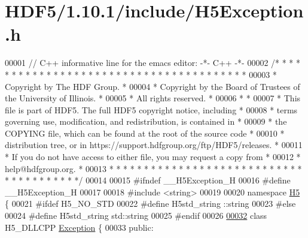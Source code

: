 \hypertarget{_h_d_f5_21_810_81_2include_2_h5_exception_8h_source}{}\section{H\+D\+F5/1.10.1/include/\+H5\+Exception.h}
\label{_h_d_f5_21_810_81_2include_2_h5_exception_8h_source}

\begin{DoxyCode}
00001 \textcolor{comment}{// C++ informative line for the emacs editor: -*- C++ -*-}
00002 \textcolor{comment}{/* * * * * * * * * * * * * * * * * * * * * * * * * * * * * * * * * * * * * * *}
00003 \textcolor{comment}{ * Copyright by The HDF Group.                                               *}
00004 \textcolor{comment}{ * Copyright by the Board of Trustees of the University of Illinois.         *}
00005 \textcolor{comment}{ * All rights reserved.                                                      *}
00006 \textcolor{comment}{ *                                                                           *}
00007 \textcolor{comment}{ * This file is part of HDF5.  The full HDF5 copyright notice, including     *}
00008 \textcolor{comment}{ * terms governing use, modification, and redistribution, is contained in    *}
00009 \textcolor{comment}{ * the COPYING file, which can be found at the root of the source code       *}
00010 \textcolor{comment}{ * distribution tree, or in https://support.hdfgroup.org/ftp/HDF5/releases.  *}
00011 \textcolor{comment}{ * If you do not have access to either file, you may request a copy from     *}
00012 \textcolor{comment}{ * help@hdfgroup.org.                                                        *}
00013 \textcolor{comment}{ * * * * * * * * * * * * * * * * * * * * * * * * * * * * * * * * * * * * * * */}
00014 
00015 \textcolor{preprocessor}{#ifndef \_\_H5Exception\_H}
00016 \textcolor{preprocessor}{#define \_\_H5Exception\_H}
00017 
00018 \textcolor{preprocessor}{#include <string>}
00019 
00020 \textcolor{keyword}{namespace }\hyperlink{namespace_h5}{H5} \{
00021 \textcolor{preprocessor}{#ifdef H5\_NO\_STD}
00022 \textcolor{preprocessor}{    #define H5std\_string ::string}
00023 \textcolor{preprocessor}{#else}
00024 \textcolor{preprocessor}{    #define H5std\_string std::string}
00025 \textcolor{preprocessor}{#endif}
00026 
\hyperlink{class_h5_1_1_exception}{00032} \textcolor{keyword}{class }H5\_DLLCPP \hyperlink{class_h5_1_1_exception}{Exception} \{
00033    \textcolor{keyword}{public}:

\end{DoxyCode}
